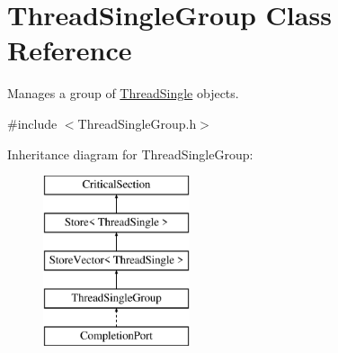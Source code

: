 \hypertarget{class_thread_single_group}{
\section{ThreadSingleGroup Class Reference}
\label{class_thread_single_group}
}


Manages a group of \hyperlink{class_thread_single}{ThreadSingle} objects.  




{\ttfamily \#include $<$ThreadSingleGroup.h$>$}

Inheritance diagram for ThreadSingleGroup:\begin{figure}[H]
\begin{center}
\leavevmode
\includegraphics[height=5.000000cm]{class_thread_single_group}
\end{center}
\end{figure}

